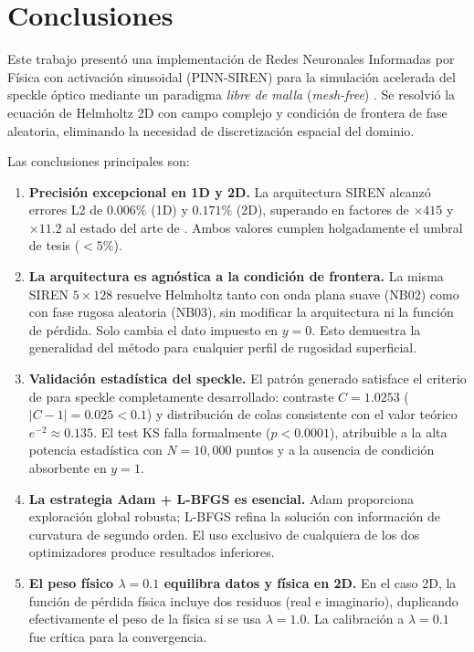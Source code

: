 
\section{Conclusiones}
\label{sec:conclusiones}

Este trabajo presentó una implementación de Redes Neuronales Informadas por Física
con activación sinusoidal (PINN-SIREN) para la simulación acelerada del speckle óptico
mediante un paradigma \textit{libre de malla} (\textit{mesh-free})
\citep{Karniadakis2021_review, Cuomo2022_review}.
Se resolvió la ecuación de Helmholtz 2D con campo complejo y condición de frontera de
fase aleatoria, eliminando la necesidad de discretización espacial del dominio.

Las conclusiones principales son:

\begin{enumerate}
  \item \textbf{Precisión excepcional en 1D y 2D.}
    La arquitectura SIREN alcanzó errores L2 de $0.006\%$ (1D) y $0.171\%$ (2D),
    superando en factores de $\times 415$ y $\times 11.2$ al estado del arte de
    \citet{Schoder2024_PINN_acoustics}.
    Ambos valores cumplen holgadamente el umbral de tesis ($< 5\%$).

  \item \textbf{La arquitectura es agnóstica a la condición de frontera.}
    La misma SIREN $5\times128$ resuelve Helmholtz tanto con onda plana suave (NB02)
    como con fase rugosa aleatoria (NB03), sin modificar la arquitectura ni la función
    de pérdida.
    Solo cambia el dato impuesto en $y = 0$.
    Esto demuestra la generalidad del método para cualquier perfil de rugosidad superficial.

  \item \textbf{Validación estadística del speckle.}
    El patrón generado satisface el criterio de \citet{Goodman2007_Speckle}
    para speckle completamente desarrollado: contraste $C = 1.0253$ ($|C-1| = 0.025 < 0.1$)
    y distribución de colas consistente con el valor teórico $e^{-2} \approx 0.135$.
    El test KS falla formalmente ($p < 0.0001$), atribuible a la alta potencia estadística
    con $N = 10{,}000$ puntos y a la ausencia de condición absorbente en $y = 1$.

  \item \textbf{La estrategia Adam + L-BFGS es esencial.}
    Adam proporciona exploración global robusta; L-BFGS refina la solución con
    información de curvatura de segundo orden.
    El uso exclusivo de cualquiera de los dos optimizadores produce resultados inferiores.

  \item \textbf{El peso físico $\lambda = 0.1$ equilibra datos y física en 2D.}
    En el caso 2D, la función de pérdida física incluye dos residuos (real e imaginario),
    duplicando efectivamente el peso de la física si se usa $\lambda = 1.0$.
    La calibración a $\lambda = 0.1$ fue crítica para la convergencia.
\end{enumerate}

